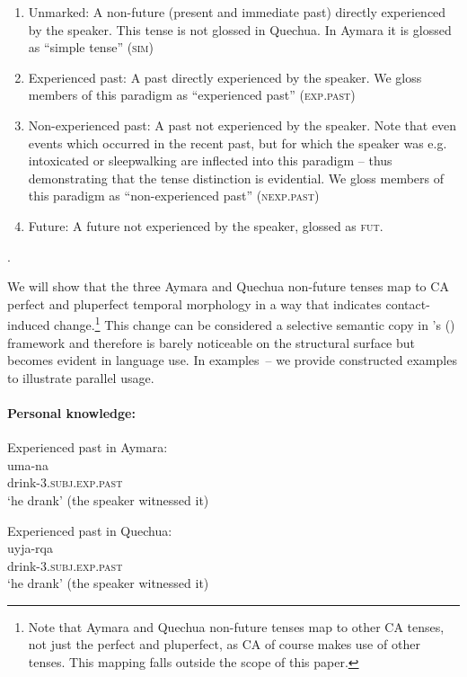 \documentclass[output=paper,hidelinks]{langscibook}
\begin{document}
\begin{enumerate}
    \item Unmarked: A non-future (present and immediate past) directly experienced by the speaker. This tense is not glossed in Quechua. In Aymara it is glossed as “simple tense” (\textsc{sim})
    \item Experienced past: A past directly experienced by the speaker. We gloss members of this paradigm as “experienced past” (\textsc{exp.past})
    \item Non-experienced past: A past not experienced by the speaker. Note that even events which occurred in the recent past, but for which the speaker was e.g. intoxicated or sleepwalking are inflected into this paradigm -- thus demonstrating that the tense distinction is evidential. We gloss members of this paradigm as “non-experienced past” (\textsc{nexp.past})
    \item Future: A future not experienced by the speaker, glossed as \textsc{fut}.
\end{enumerate}.

We will show that the three Aymara and Quechua non-future tenses map to CA perfect and pluperfect temporal morphology in a way that indicates contact-induced change.\footnote{Note that Aymara and Quechua non-future tenses map to other CA tenses, not just the perfect and pluperfect, as CA of course makes use of other tenses. This mapping falls outside the scope of this paper.} This change can be considered a selective semantic copy in \citeauthor{RN59}'s (\citeyear{RN59}) framework and therefore is barely noticeable on the structural surface but becomes evident in language use. In examples~-- we provide constructed examples to illustrate parallel usage.

\paragraph*{Personal knowledge:}

\ea \label{ex:exp.pastAym}
 {Experienced past in Aymara:} \\
\gll uma-na \\
drink-\textsc{3.subj.exp.past} \\ 
\glt ‘he drank’ (the speaker witnessed it)
\z

\ea \label{ex:exp.pastQ}
 {Experienced past in Quechua:} \\
\gll uyja-rqa \\
drink-\textsc{3.subj.exp.past} \\ 
\glt ‘he drank’ (the speaker witnessed it)
\z
\end{document}
